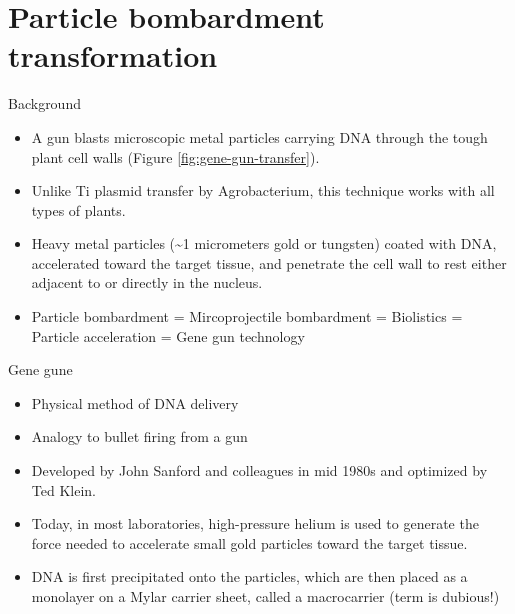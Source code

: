 \documentclass[
  ignorenonframetext,
  aspectratio=169]{beamer}
\providecommand{\tightlist}{%
  \setlength{\itemsep}{0pt}\setlength{\parskip}{0pt}}
\begin{document}
\hypertarget{particle-bombardment-transformation}{%
\section{Particle bombardment
transformation}\label{particle-bombardment-transformation}}

\begin{frame}{Background}
\protect\hypertarget{background-1}{}
\begin{itemize}
\tightlist
\item
  A gun blasts microscopic metal particles carrying DNA through the
  tough plant cell walls (Figure \ref{fig:gene-gun-transfer}).
\item
  Unlike Ti plasmid transfer by Agrobacterium, this technique works with
  all types of plants.
\item
  Heavy metal particles (\textasciitilde1 micrometers gold or tungsten)
  coated with DNA, accelerated toward the target tissue, and penetrate
  the cell wall to rest either adjacent to or directly in the nucleus.
\item
  Particle bombardment = Mircoprojectile bombardment = Biolistics =
  Particle acceleration = Gene gun technology
\end{itemize}
\end{frame}

\begin{frame}{Gene gune}
\protect\hypertarget{gene-gune}{}
\begin{itemize}
\tightlist
\item
  Physical method of DNA delivery
\item
  Analogy to bullet firing from a gun
\item
  Developed by John Sanford and colleagues in mid 1980s and optimized by
  Ted Klein.
\item
  Today, in most laboratories, high-pressure helium is used to generate
  the force needed to accelerate small gold particles toward the target
  tissue.
\item
  DNA is first precipitated onto the particles, which are then placed as
  a monolayer on a Mylar carrier sheet, called a macrocarrier (term is
  dubious!)
\end{itemize}
\end{frame}
\end{document}
